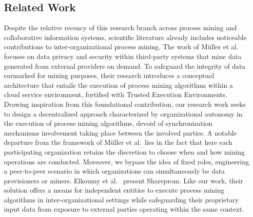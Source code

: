\subsection{Related Work}
Despite the relative recency of this research branch across process mining and collaborative information systems, scientific literature already includes noticeable contributions to inter-organizational process mining. %
The work of M{\"u}ller et al.~\citep{muller2021process} focuses on data privacy and security within third-party systems that mine data generated from external providers on demand. To safeguard the integrity of data earmarked for mining purposes, their research introduces a conceptual architecture that entails the execution of process mining algorithms within a cloud service environment, fortified with Trusted Execution Environments. %
Drawing inspiration from this foundational contribution, our research work seeks to design a decentralized approach characterized by organizational autonomy in the execution of process mining algorithms, devoid of synchronization mechanisms involvement taking place between the involved parties. A notable departure from the framework of M{\"u}ller et al.\ lies in the fact that here %
each participating organization retains the discretion to choose when and how mining operations are conducted. Moreover, we bypass the idea of fixed roles, engineering a peer-to-peer scenario in which organizations can simultaneously be data provisioners or miners.
Elkoumy et al.~\citep{elkoumy2020shareprom,elkoumy2020secure} present Shareprom. Like our work, their solution offers a means for independent entities to execute process mining algorithms in inter-organizational settings while safeguarding their proprietary input data from exposure to external parties operating within the same context.

